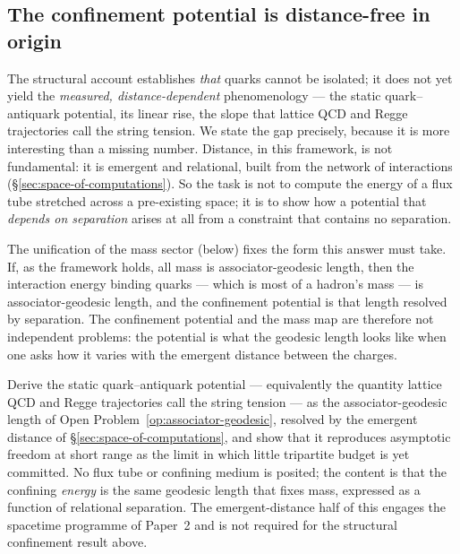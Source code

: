 \subsection{The confinement potential is distance-free in origin}

The structural account establishes \emph{that} quarks cannot be isolated; it does not yet yield the
\emph{measured, distance-dependent} phenomenology --- the static quark--antiquark potential, its
linear rise, the slope that lattice QCD and Regge trajectories call the string tension. We state the
gap precisely, because it is more interesting than a missing number. Distance, in this framework, is
not fundamental: it is emergent and relational, built from the network of interactions
(\S\ref{sec:space-of-computations}). So the task is not to compute the energy of a flux tube stretched across a
pre-existing space; it is to show how a potential that \emph{depends on separation} arises at all
from a constraint that contains no separation.

The unification of the mass sector (below) fixes the form this answer must take. If, as the framework
holds, all mass is associator-geodesic length, then the interaction energy binding quarks --- which
is most of a hadron's mass --- is associator-geodesic length, and the confinement potential is that
length resolved by separation. The confinement potential and the mass map are therefore not
independent problems: the potential is what the geodesic length looks like when one asks how it
varies with the emergent distance between the charges.

\begin{openproblem}\label{op:confinement-potential}
Derive the static quark--antiquark potential --- equivalently the quantity lattice QCD and Regge
trajectories call the string tension --- as the associator-geodesic length of
Open Problem~\ref{op:associator-geodesic}, resolved by the emergent distance of
\S\ref{sec:space-of-computations}, and show that it reproduces asymptotic freedom at short range as the limit in
which little tripartite budget is yet committed. No flux tube or confining medium is posited; the
content is that the confining \emph{energy} is the same geodesic length that fixes mass, expressed as
a function of relational separation. The emergent-distance half of this engages the spacetime
programme of Paper~2 and is not required for the structural confinement result above.
\end{openproblem}

